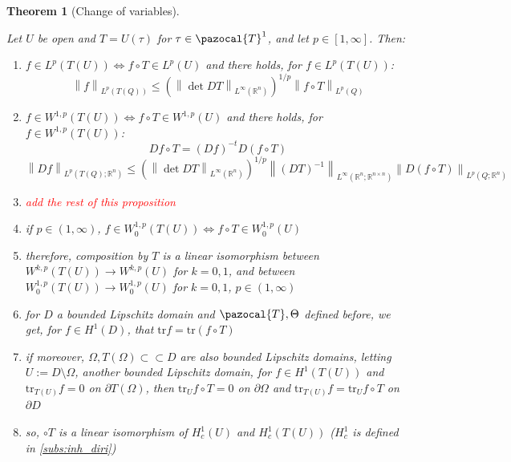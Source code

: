 \documentclass[english,a4paper,10pt,oneside]{scrbook}	%
\theoremstyle{break}
\newtheorem{thm}[equation]{Theorem}
\theoremstyle{remark}
\newcommand{\mR}{\mathbb{R}}
\newcommand{\norm}[1]{\left\lVert#1\right\rVert}
\newcommand{\tr}{\text{tr}}
\newcommand{\cc}{\subset\subset}
\newcommand{\cT}{\pazocal{T}}
\newcommand{\Te}{\Theta}
\newcommand{\tred}[1]{\textcolor{red}{#1}}
\begin{document}
\begin{thm}[Change of variables]
\label{thm:change}

Let $U$ be open and $T = U(\tau)$ for $\tau \in \cT^1$, and let $p \in [ 1,\infty]$. Then:

\begin{enumerate}
	\item $f \in L^p(T(U)) \iff f\circ T \in L^p(U)$ and there holds, for $f \in L^p(T(U))$:
	$$ \norm{f}_{L^p(T(Q))}\leq \left ( \norm{\det DT}_{L^\infty(\mR^n)}\right)^{1/p} \norm{f\circ T}_{L^p(Q)}$$
	\item $f \in W^{1,p}(T(U)) \iff f\circ T \in W^{1,p}(U)$ and there holds, for $f\in W^{1,p}(T(U))$:
	$$Df \circ T = (Df)^{-t}D(f\circ T)$$
	$$ \norm{Df}_{L^p(T(Q);\mR^n)}\leq \left ( \norm{\det DT}_{L^\infty(\mR^n)}\right)^{1/p} \norm{(DT)^{-1}}_{L^\infty(\mR^n;\mR^{n\times n})}\norm{D(f\circ T)}_{L^p(Q;\mR^n)}$$
	\item \tred{add the rest of this proposition}
	\item if $p \in (1, \infty)$, $f \in W^{1,p}_0(T(U)) \iff f\circ T \in W^{1,p}_0(U)$
	\item therefore, composition by $T$ is a linear isomorphism between $W^{k,p}(T(U))\rightarrow W^{k,p}(U)$ for $k=0,1$, and between $W^{1,p}_0(T(U))\rightarrow W^{1,p}_0(U)$ for $k=0,1$, $p \in (1, \infty)$
	\item for $D$ a bounded Lipschitz domain and $\cT, \Te$ defined before, we get, for $f \in H^1(D)$, that $\tr f = \tr(f\circ T)$
	\item if moreover, $\Omega, T(\Omega) \cc D$ are also bounded Lipschitz domains, letting $U:=D\setminus \Omega$, another bounded Lipschitz domain, for $f \in H^1(T(U))$ and $\tr_{T(U)} f =0 $ on $ \partial T(\Omega) $, then $\tr_{U} f\circ T=0$ on $\partial \Omega$ and $\tr_{T(U)} f = \tr_{U} f\circ T$ on $\partial D$
	\item so, $\circ T$ is a linear isomorphism of $H^1_c(U)$ and $H^1_c(T(U))$ ($H^1_c$ is defined in \cref{subs:inh_diri})
\end{enumerate}

\end{thm}
\end{document}
